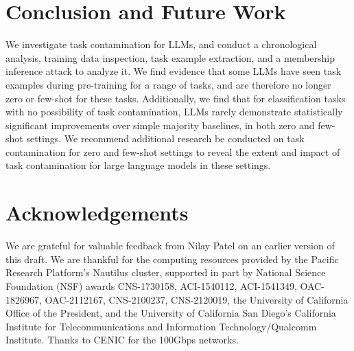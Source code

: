 \documentclass[letterpaper]{article} %
\newcommand{\jmf}[1]{}      %
\begin{document}




\section{Conclusion and Future Work}
We investigate task contamination for LLMs, and conduct a chronological analysis, training data inspection, task example extraction, and a membership inference attack to analyze it. We find evidence that some LLMs have seen task examples during pre-training for a range of tasks, and are therefore no longer zero or few-shot for these tasks.  Additionally, we find that for classification tasks with no possibility of task contamination, LLMs rarely demonstrate statistically significant improvements over simple majority baselines, in both zero and few-shot settings. We recommend additional research be conducted on task contamination for zero and few-shot settings to reveal the extent and impact of task contamination for large language models in these settings.

\section*{Acknowledgements}

We are grateful for valuable feedback from Nilay Patel on an earlier version of this draft.  
We are thankful for the computing resources provided by the Pacific Research Platform's Nautilus cluster, supported in part by National Science Foundation (NSF) awards CNS-1730158, ACI-1540112, ACI-1541349, OAC-1826967, OAC-2112167, CNS-2100237, CNS-2120019, the University of California Office of the President, and the University of California San Diego's California Institute for Telecommunications and Information Technology/Qualcomm Institute. Thanks to CENIC for the 100Gbps networks.
\end{document}
